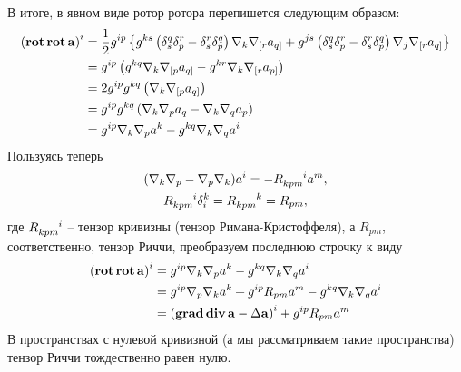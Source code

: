 \documentclass[12pt,a4paper]{article}
\begin{document}
        В итоге, в явном виде ротор ротора перепишется следующим образом:
        \begin{equation}\begin{aligned}
            \left( \operatorname{\mathbf{rot}}\operatorname{\mathbf{rot}}\mathbf{a} \right)^i
                &= \frac{1}{2} g^{ip} \left\{
                       g^{ks} \left(
                           \delta_s^q \delta_p^r - \delta_s^r \delta_p^q
                       \right) \nabla_k \nabla_{[r} a_{q]} +
                       g^{js} \left(
                           \delta_s^q \delta_p^r - \delta_s^r \delta_p^q
                       \right) \nabla_j \nabla_{[r} a_{q]}
                   \right\} \\
                &= g^{ip} \left(
                       g^{kq} \nabla_k \nabla_{[p} a_{q]} - g^{kr} \nabla_k \nabla_{[r} a_{p]}
                   \right) \\
                &= 2 g^{ip} g^{kq} \left(
                       \nabla_k \nabla_{[p} a_{q]}
                   \right) \\
                &= g^{ip} g^{kq} \left(
                       \nabla_k \nabla_{p} a_{q} - \nabla_k \nabla_{q} a_{p}
                   \right) \\
                &= g^{ip} \nabla_k \nabla_{p} a^k - g^{kq} \nabla_k \nabla_{q} a^i
        \end{aligned}\end{equation}
        Пользуясь теперь
        \begin{equation}\begin{gathered}
            (\nabla_k \nabla_p - \nabla_p \nabla_k) a^i = - R_{kpm}^{\hphantom{kpm}i} a^m , \\
            R_{kpm}^{\hphantom{kpm}i} \delta_i^k = R_{kpm}^{\hphantom{kpm}k} = R_{pm} ,
        \end{gathered}\end{equation}
        где $R_{kpm}^{\hphantom{kpm}i}$ -- тензор кривизны (тензор Римана-Кристоффеля), а $R_{pm}$, соответственно, тензор Риччи, преобразуем последнюю строчку к виду
        \begin{equation}\begin{aligned}
            \left( \operatorname{\mathbf{rot}}\operatorname{\mathbf{rot}}\mathbf{a} \right)^i
                &= g^{ip} \nabla_k \nabla_p a^k - g^{kq} \nabla_k \nabla_q a^i \\
                &= g^{ip} \nabla_p \nabla_k a^k
                    + g^{ip} R_{pm} a^m
                    - g^{kq} \nabla_k \nabla_q a^i \\
                &= \left( \operatorname{\mathbf{grad}}\operatorname{\mathbf{div}}{\mathbf{a}} - \Delta{\mathbf{a}} \right)^i + g^{ip} R_{pm} a^m
        \end{aligned}\end{equation}
        В пространствах с нулевой кривизной (а мы рассматриваем такие пространства) тензор Риччи тождественно равен нулю.
\end{document}
